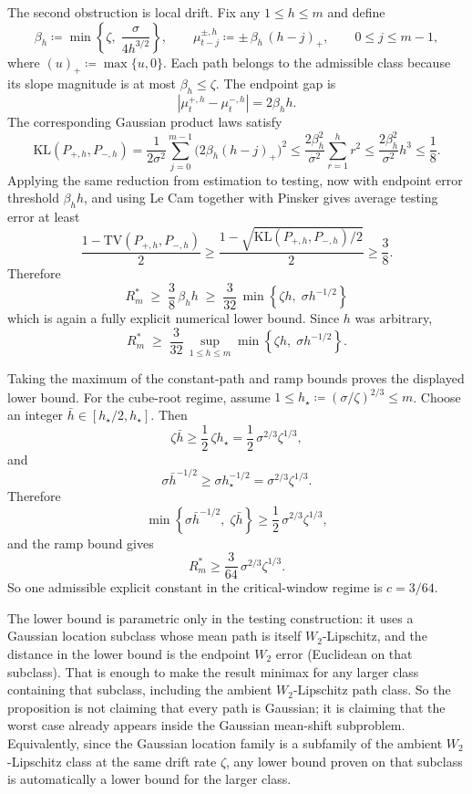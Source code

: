The second obstruction is local drift. Fix any $1\leq h\leq m$ and define
\[
  \beta_h \coloneqq \min\!\left\{\zeta,\; \frac{\sigma}{4h^{3/2}}\right\},
  \qquad
  \mu^{\pm,h}_{t-j} \coloneqq \pm \,\beta_h\,(h-j)_+, 
  \qquad 0\leq j\leq m-1,
\]
where $(u)_+ \coloneqq \max\{u,0\}$. Each path belongs to the admissible
class because its slope magnitude is at most $\beta_h \leq \zeta$. The
endpoint gap is
\[
  |\mu_t^{+,h} - \mu_t^{-,h}| = 2\beta_h h.
\]
The corresponding Gaussian product laws satisfy
\[
  \mathrm{KL}(P_{+,h},P_{-,h})
  = \frac{1}{2\sigma^2} \sum_{j=0}^{m-1}
    \bigl(2\beta_h (h-j)_+\bigr)^2
  \leq \frac{2\beta_h^2}{\sigma^2} \sum_{r=1}^{h} r^2
  \leq \frac{2\beta_h^2}{\sigma^2} h^3
  \leq \frac{1}{8}.
\]
Applying the same reduction from estimation to testing, now with endpoint error
threshold $\beta_h h$, and using Le Cam together with Pinsker gives average
testing error at least
\[
  \frac{1-\mathrm{TV}(P_{+,h},P_{-,h})}{2}
  \geq
  \frac{1-\sqrt{\mathrm{KL}(P_{+,h},P_{-,h})/2}}{2}
  \geq \frac{3}{8}.
\]
Therefore
\[
  R_m^* \;\geq\; \frac{3}{8}\,\beta_h h
  \;\geq\;
  \frac{3}{32}\,\min\!\left\{\zeta h,\; \sigma h^{-1/2}\right\}
\]
which is again a fully explicit numerical lower bound. Since $h$ was arbitrary,
\[
  R_m^* \;\geq\;
  \frac{3}{32}\,\sup_{1\leq h\leq m}
  \min\!\left\{\zeta h,\; \sigma h^{-1/2}\right\}.
\]

Taking the maximum of the constant-path and ramp bounds proves the displayed
lower bound. For the cube-root regime, assume
$1 \leq h_\star \coloneqq (\sigma/\zeta)^{2/3} \leq m$. Choose an integer
$\bar h \in [h_\star/2, h_\star]$. Then
\[
  \zeta \bar h \geq \frac{1}{2}\,\zeta h_\star
  = \frac{1}{2}\,\sigma^{2/3}\zeta^{1/3},
\]
and
\[
  \sigma \bar h^{-1/2}
  \geq \sigma h_\star^{-1/2}
  = \sigma^{2/3}\zeta^{1/3}.
\]
Therefore
\[
  \min\!\left\{\sigma \bar h^{-1/2},\; \zeta \bar h\right\}
  \geq \frac{1}{2}\,\sigma^{2/3}\zeta^{1/3},
\]
and the ramp bound gives
\[
  R_m^* \geq \frac{3}{64}\,\sigma^{2/3}\zeta^{1/3}.
\]
So one admissible explicit constant in the critical-window regime is
$c = 3/64$.

\begin{remark}\label{rem:lower_bound_scope}
The lower bound is parametric only in the testing construction: it uses a
Gaussian location subclass whose mean path is itself $W_2$-Lipschitz, and the
distance in the lower bound is the endpoint $W_2$ error (Euclidean on that
subclass). That is enough to make the result minimax for any larger class
containing that subclass, including the ambient $W_2$-Lipschitz path class.
So the proposition is not claiming that every path is Gaussian; it is
claiming that the worst case already appears inside the Gaussian mean-shift
subproblem.
Equivalently, since the Gaussian location family is a subfamily of the ambient
$W_2$-Lipschitz class at the same drift rate $\zeta$, any lower bound proven on
that subclass is automatically a lower bound for the larger class.
\end{remark}

